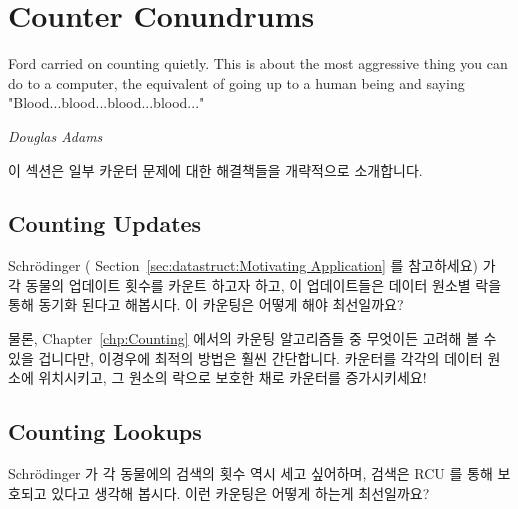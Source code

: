 
\section{Counter Conundrums}
\label{sec:together:Counter Conundrums}
%
\epigraph{Ford carried on counting quietly.
	  This is about the most aggressive thing you can do to a
	  computer, the equivalent of going up to a human being and saying
	  "Blood...blood...blood...blood..."}
	 {\emph{Douglas Adams}}

이 섹션은 일부 카운터 문제에 대한 해결책들을 개략적으로 소개합니다.
\iffalse

This section outlines possible solutions to some counter conundrums.
\fi

\subsection{Counting Updates}
\label{sec:together:Counting Updates}

Schr\"odinger (
Section~\ref{sec:datastruct:Motivating Application} 를 참고하세요) 가 각 동물의
업데이트 횟수를 카운트 하고자 하고, 이 업데이트들은 데이터 원소별 락을 통해
동기화 된다고 해봅시다.
이 카운팅은 어떻게 해야 최선일까요?

물론,
Chapter~\ref{chp:Counting}
에서의 카운팅 알고리즘들 중 무엇이든 고려해 볼 수 있을 겁니다만, 이경우에
최적의 방법은 훨씬 간단합니다.
카운터를 각각의 데이터 원소에 위치시키고, 그 원소의 락으로 보호한 채로 카운터를
증가시키세요!
\iffalse

Suppose that Schr\"odinger (see
Section~\ref{sec:datastruct:Motivating Application})
wants to count the number of updates for each animal,
and that these updates are synchronized using a per-data-element lock.
How can this counting best be done?

Of course, any number of counting algorithms from
Chapter~\ref{chp:Counting}
might be considered, but the optimal approach is much simpler in this case.
Just place a counter in each data element, and increment it under the
protection of that element's lock!
\fi

\subsection{Counting Lookups}
\label{sec:together:Counting Lookups}

Schr\"odinger 가 각 동물에의 검색의 횟수 역시 세고 싶어하며, 검색은 RCU 를 통해
보호되고 있다고 생각해 봅시다.
이런 카운팅은 어떻게 하는게 최선일까요?

